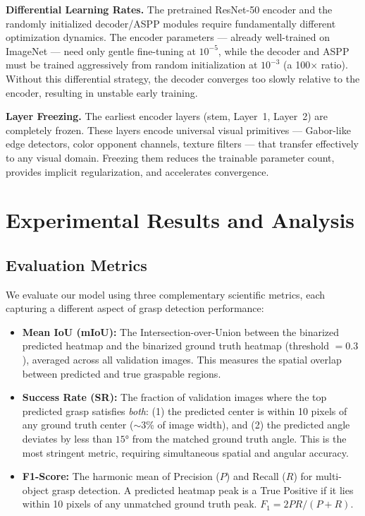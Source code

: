 \documentclass[12pt, a4paper]{article}
\begin{document}
\textbf{Differential Learning Rates.}
The pretrained ResNet-50 encoder and the randomly initialized decoder/ASPP modules require fundamentally different optimization dynamics. The encoder parameters — already well-trained on ImageNet — need only gentle fine-tuning at $10^{-5}$, while the decoder and ASPP must be trained aggressively from random initialization at $10^{-3}$ (a 100$\times$ ratio). Without this differential strategy, the decoder converges too slowly relative to the encoder, resulting in unstable early training.

\textbf{Layer Freezing.}
The earliest encoder layers (stem, Layer~1, Layer~2) are completely frozen. These layers encode universal visual primitives — Gabor-like edge detectors, color opponent channels, texture filters — that transfer effectively to any visual domain. Freezing them reduces the trainable parameter count, provides implicit regularization, and accelerates convergence.

\section{Experimental Results and Analysis}
\label{sec:results}

\subsection{Evaluation Metrics}

We evaluate our model using three complementary scientific metrics, each capturing a different aspect of grasp detection performance:

\begin{itemize}[leftmargin=2em]
    \item \textbf{Mean IoU (mIoU):} The Intersection-over-Union between the binarized predicted heatmap and the binarized ground truth heatmap (threshold $= 0.3$), averaged across all validation images. This measures the spatial overlap between predicted and true graspable regions.

    \item \textbf{Success Rate (SR):} The fraction of validation images where the top predicted grasp satisfies \textit{both}: (1) the predicted center is within 10 pixels of any ground truth center ($\sim$3\% of image width), and (2) the predicted angle deviates by less than $15°$ from the matched ground truth angle. This is the most stringent metric, requiring simultaneous spatial and angular accuracy.

    \item \textbf{F1-Score:} The harmonic mean of Precision ($P$) and Recall ($R$) for multi-object grasp detection. A predicted heatmap peak is a True Positive if it lies within 10 pixels of any unmatched ground truth peak. $F_1 = 2PR / (P + R)$.
\end{itemize}
\end{document}
